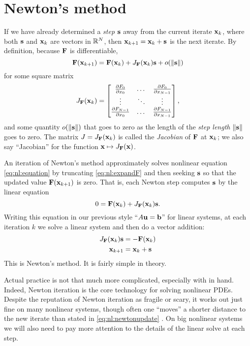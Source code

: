 \section{Newton's method}

If we have already determined a \emph{step} $\mathbf{s}$ away from the current iterate $\mathbf{x}_k$, where both $\mathbf{s}$ and $\mathbf{x}_k$ are vectors in $\mathbb{R}^N$, then $\mathbf{x}_{k+1} = \mathbf{x}_k + \mathbf{s}$ is the next iterate.  By definition, because $\mathbf{F}$ is differentiable,
\begin{equation}
    \mathbf{F}(\mathbf{x}_{k+1}) = \mathbf{F}(\mathbf{x}_k) + J_{\mathbf{F}}(\mathbf{x}_k) \mathbf{s} + o(\|\mathbf{s}\|)  \label{eq:nl:expandF}
\end{equation}
for some square matrix
\begin{equation}
J_{\mathbf{F}}(\mathbf{x}_k) = \begin{bmatrix}
    \frac{\partial F_0}{\partial x_0} & \dots & \frac{\partial F_0}{\partial x_{N-1}} \\
    \vdots & \ddots & \vdots \\
    \frac{\partial F_{N-1}}{\partial x_0} & \dots & \frac{\partial F_{N-1}}{\partial x_{N-1}}  \end{bmatrix},  \label{eq:nl:jacdefn}
\end{equation}
and some quantity $o(\|\mathbf{s}\|)$ that goes to zero as the length of the \emph{step length} $\|\mathbf{s}\|$ goes to zero.  The matrix $J = J_{\mathbf{F}}(\mathbf{x}_k)$ is called the \emph{Jacobian} of $\mathbf{F}$ at $\mathbf{x}_k$; we also say ``Jacobian'' for the function $\mathbf{x} \mapsto J_{\mathbf{F}}(\mathbf{x})$.

An iteration of Newton's method approximately solves nonlinear equation \eqref{eq:nl:equation} by truncating \eqref{eq:nl:expandF} and then seeking $\mathbf{s}$ so that the updated value $\mathbf{F}(\mathbf{x}_{k+1})$ is zero.  That is, each Newton step computes $\mathbf{s}$ by the linear equation
\begin{equation}
    0 = \mathbf{F}(\mathbf{x}_k) + J_{\mathbf{F}}(\mathbf{x}_k) \mathbf{s}.
\end{equation}
Writing this equation in our previous style ``$A\mathbf{u}=\mathbf{b}$'' for linear systems, at each iteration $k$ we solve a linear system and then do a vector addition:
\begin{align}
    J_{\mathbf{F}}(\mathbf{x}_k) \mathbf{s} &= - \mathbf{F}(\mathbf{x}_k)  \label{eq:nl:newtoneq}  \\
    \mathbf{x}_{k+1} &= \mathbf{x}_k + \mathbf{s}  \label{eq:nl:newtonupdate}
\end{align}
This is Newton's method.  It is fairly simple in theory.

Actual practice is not that much more complicated, especially with \PETSc in hand.  Indeed,   Newton iteration is the core technology for solving nonlinear PDEs.  Despite the reputation of Newton iteration as fragile or scary, it works out just fine on many nonlinear systems, though often one ``moves'' a shorter distance to the new iterate than stated in \eqref{eq:nl:newtonupdate} \citep{Kelley2003}.  On big nonlinear systems we will also need to pay more attention to the details of the linear solve at each step.

